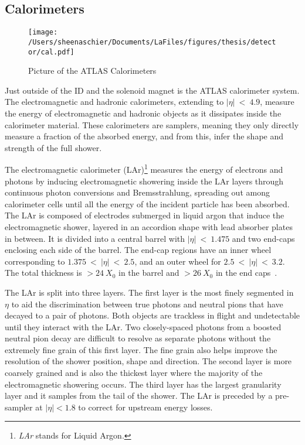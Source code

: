 \subsection{Calorimeters}
  \begin{figure}[tbp]
  \centering
 \texttt{[image: /Users/sheenaschier/Documents/LaFiles/figures/thesis/detector/cal.pdf]}
    \caption{Picture of the ATLAS Calorimeters}
   \label{fig:cal}
 \end{figure}
 Just outside of the ID and the solenoid magnet is the ATLAS calorimeter system.  The electromagnetic and hadronic calorimeters, extending to $|\eta|~<~4.9$, measure the energy of electromagnetic and hadronic objects as it dissipates inside the calorimeter material.  These calorimeters are samplers, meaning they only directly measure a fraction of the absorbed energy, and from this, infer the shape and strength of the full shower.


The electromagnetic calorimeter (LAr)\footnote{\textit{LAr} stands for Liquid Argon.} measures the energy of electrons and photons by inducing electromagnetic showering inside the LAr layers through continuous photon conversions and Bremsstrahlung, spreading out among calorimeter cells until all the energy of the incident particle has been absorbed.  The LAr is composed of electrodes submerged in liquid argon that induce the electromagnetic shower, layered in an accordion shape with lead absorber plates in between. It is divided into a central barrel with $|\eta|~<~1.475$ and two end-caps enclosing each side of the barrel.  The end-cap regions have an inner wheel corresponding to $1.375~<~|\eta|~<~2.5$, and an outer wheel for $2.5~<~|\eta|~<~3.2$.  The total thickness is $> 24~X_0$ in the barrel and $>26~X_0 $ in the end caps~\cite{wilkens:J160}.  

The LAr is split into three layers.  The first layer is the most finely segmented in $\eta$ to aid the discrimination between true photons and neutral pions that have decayed to a pair of photons.  Both objects are trackless in flight and undetectable until they interact with the LAr.  Two closely-spaced photons from a boosted neutral pion decay are difficult to resolve as separate photons without the extremely fine grain of this first layer.  The fine grain also helps improve the resolution of the shower position, shape and direction.  The second layer is more coarsely grained and is also the thickest layer where the majority of the electromagnetic showering occurs.  The third layer has the largest granularity layer and it samples from the tail of the shower.  The LAr is preceded by a pre-sampler at $|\eta| < 1.8$ to correct for upstream energy losses. 



